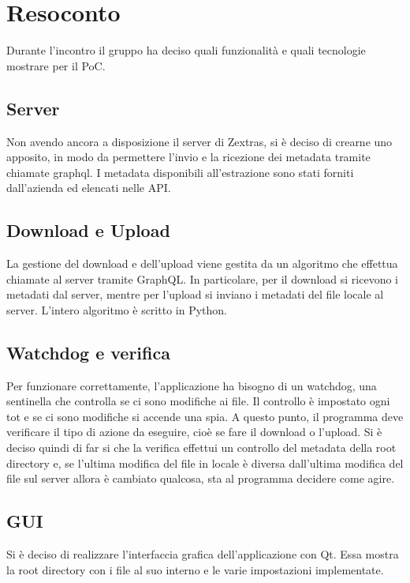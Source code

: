 \newpage


\section{Resoconto}

Durante l'incontro il gruppo \gruppo{} ha deciso quali funzionalità e quali tecnologie mostrare per il PoC.

\subsection{Server}

Non avendo ancora a disposizione il server di Zextras, si è deciso di crearne uno apposito, in modo da permettere l'invio e la ricezione dei metadata tramite chiamate graphql. I metadata disponibili all'estrazione sono stati forniti dall'azienda ed elencati nelle API.

\subsection{Download e Upload}

La gestione del download e dell'upload viene gestita da un algoritmo che effettua chiamate al server tramite GraphQL. In particolare, per il download si ricevono i metadati dal server, mentre per l'upload si inviano i metadati del file locale al server.  L'intero algoritmo è scritto in Python.

\subsection{Watchdog e verifica}

Per funzionare correttamente, l'applicazione ha bisogno di un watchdog, una sentinella che controlla se ci sono modifiche ai file. Il controllo è impostato ogni tot e se ci sono modifiche si accende una spia. A questo punto, il programma deve verificare il tipo di azione da eseguire, cioè se fare il download o l'upload. Si è deciso quindi di far si che la verifica effettui un controllo del metadata della root directory e, se l'ultima modifica del file in locale è diversa dall'ultima modifica del file sul server allora è cambiato qualcosa, sta al programma decidere come agire. 

\subsection{GUI}

Si è deciso di realizzare l'interfaccia grafica dell'applicazione con Qt. Essa mostra la root directory con i file al suo interno e le varie impostazioni implementate. 






